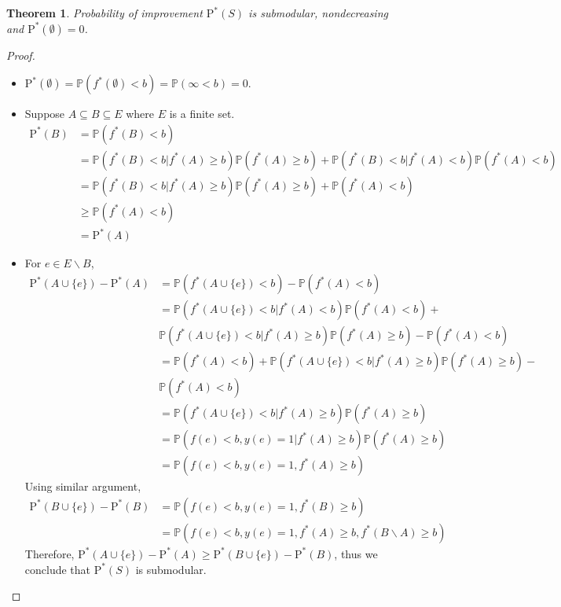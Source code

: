 \documentclass[12pt]{article}
\newcommand{\PI}{\text{P}^*}
\newtheorem{thm}{Theorem}
\begin{document}
\begin{thm} 
Probability of improvement $\PI(S)$ is submodular, nondecreasing and $\PI(\emptyset)=0$.
\end{thm}
\begin{proof}
\begin{itemize}
\item
$\PI(\emptyset) = \mathbb{P}(f^*(\emptyset)<b) = \mathbb{P}(\infty<b)=0$.
\item
Suppose $A \subseteq B \subseteq E$ where $E$ is a finite set.
\begin{align*}
\PI(B) &= \mathbb{P}(f^*(B)<b) \\
       &= \mathbb{P}(f^*(B)<b |f^*(A) \geq b) \mathbb{P}(f^*(A) \geq b) + \mathbb{P}(f^*(B)<b |f^*(A)<b) \mathbb{P}(f^*(A)<b) \\
       &= \mathbb{P}(f^*(B)<b |f^*(A) \geq b) \mathbb{P}(f^*(A) \geq b) + \mathbb{P}(f^*(A)<b) \\
       &\geq \mathbb{P}(f^*(A)<b) \\
       &= \PI(A)
\end{align*}
\item
For $e \in E\backslash B$,
\begin{align*}
\PI(A \cup \{e\}) - \PI(A) &= \mathbb{P}(f^*(A \cup \{e\})<b)-\mathbb{P}(f^*(A)<b)\\
                           &= \mathbb{P}(f^*(A \cup \{e\})<b|f^*(A)<b)\mathbb{P}(f^*(A)<b) + \\
                           &\mathbb{P}(f^*(A \cup \{e\})<b|f^*(A)\geq b)\mathbb{P}(f^*(A)\geq b) -\mathbb{P}(f^*(A)<b) \\
                           &=\mathbb{P}(f^*(A)<b) + \mathbb{P}(f^*(A \cup \{e\})<b|f^*(A)\geq b)\mathbb{P}(f^*(A)\geq b) -\\
                           &\mathbb{P}(f^*(A)<b)\\
                           &= \mathbb{P}(f^*(A \cup \{e\})<b|f^*(A)\geq b)\mathbb{P}(f^*(A)\geq b) \\
                           &= \mathbb{P}(f(e)<b, y(e)=1|f^*(A)\geq b)\mathbb{P}(f^*(A)\geq b) \\
                           &= \mathbb{P}(f(e)<b, y(e)=1,f^*(A)\geq b)
\end{align*}
Using similar argument,
\begin{align*}
\PI(B \cup \{e\}) - \PI(B) &= \mathbb{P}(f(e)<b, y(e)=1,f^*(B)\geq b) \\
                           &= \mathbb{P}(f(e)<b, y(e)=1,f^*(A)\geq b, f^*(B\backslash A) \geq b )
\end{align*}
Therefore, $\PI(A \cup \{e\}) - \PI(A) \geq \PI(B \cup \{e\}) - \PI(B)$, thus we conclude that $\PI(S)$ is submodular.
\end{itemize}
\end{proof}
\end{document}
